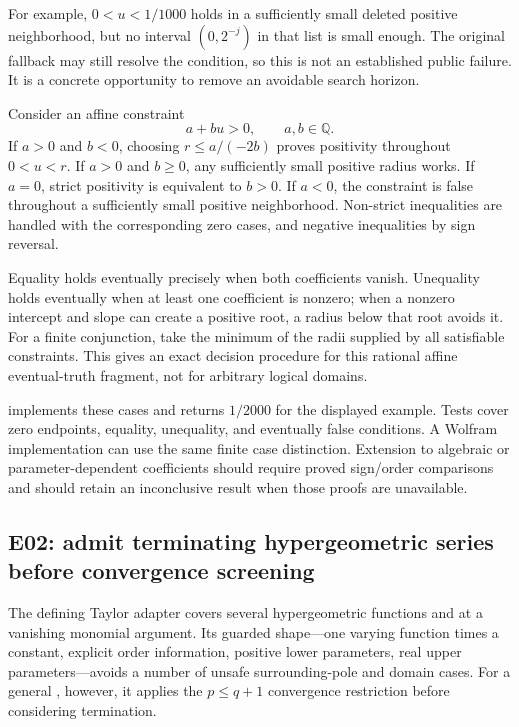 \documentclass[11pt,letterpaper]{article}
\newcommand{\code}[1]{\texttt{\detokenize{#1}}}
\begin{document}
For example, $0<u<1/1000$ holds in a sufficiently small deleted positive neighborhood, but no interval $(0,2^{-j})$ in that list is small enough. The original fallback may still resolve the condition, so this is not an established public failure. It is a concrete opportunity to remove an avoidable search horizon.

Consider an affine constraint
\[
 a+bu>0,\qquad a,b\in\mathbb Q.
\]
If $a>0$ and $b<0$, choosing $r\le a/(-2b)$ proves positivity throughout $0<u<r$. If $a>0$ and $b\ge0$, any sufficiently small positive radius works. If $a=0$, strict positivity is equivalent to $b>0$. If $a<0$, the constraint is false throughout a sufficiently small positive neighborhood. Non-strict inequalities are handled with the corresponding zero cases, and negative inequalities by sign reversal.

Equality holds eventually precisely when both coefficients vanish. Unequality holds eventually when at least one coefficient is nonzero; when a nonzero intercept and slope can create a positive root, a radius below that root avoids it. For a finite conjunction, take the minimum of the radii supplied by all satisfiable constraints. This gives an exact decision procedure for this rational affine eventual-truth fragment, not for arbitrary logical domains.

 implements these cases and returns $1/2000$ for the displayed example. Tests cover zero endpoints, equality, unequality, and eventually false conditions. A Wolfram implementation can use the same finite case distinction. Extension to algebraic or parameter-dependent coefficients should require proved sign/order comparisons and should retain an inconclusive result when those proofs are unavailable.

\subsection{E02: admit terminating hypergeometric series before convergence screening}

The defining Taylor adapter covers several hypergeometric functions and \code{PolyLog} at a vanishing monomial argument. Its guarded shape---one varying function times a constant, explicit order information, positive lower parameters, real upper parameters---avoids a number of unsafe surrounding-pole and domain cases. For a general \code{HypergeometricPFQ}, however, it applies the $p\le q+1$ convergence restriction before considering termination.\cite{mathics-taylor}
\end{document}
